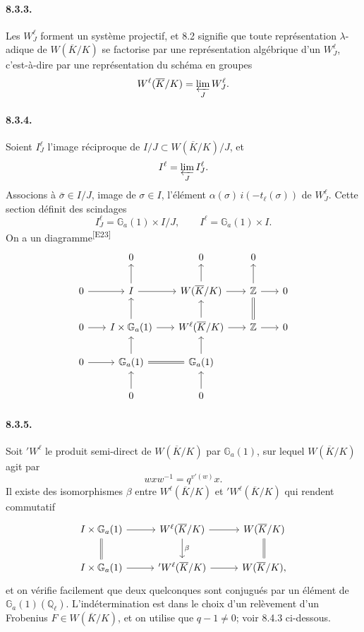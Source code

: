 \documentclass[10pt,letterpaper]{article}
\newcommand{\Z}{\mathbb Z}
\newcommand{\auditmark}[1]{\textsuperscript{\normalfont\scriptsize[E#1]}}
\begin{document}
\paragraph{8.3.3.} Les \(W_J^\ell\) forment un système projectif, et 8.2 signifie que toute représentation \(\lambda\)-adique de \(W(\overline K/K)\) se factorise par une représentation algébrique d'un \(W_J^\ell\), c'est-à-dire par une représentation du schéma en groupes
\[
W^\ell(\overline K/K)=\varprojlim_J W_J^\ell.
\]

\paragraph{8.3.4.} Soient \(I_J^\ell\) l'image réciproque de \(I/J\subset W(\overline K/K)/J\), et
\[
I^\ell=\varprojlim_J I_J^\ell.
\]
Associons à \(\bar\sigma\in I/J\), image de \(\sigma\in I\), l'élément \(\alpha(\sigma)\,i(-t_\ell(\sigma))\) de \(W_J^\ell\). Cette section définit des scindages
\[
I_J^\ell=\mathbb G_a(1)\times I/J,
\qquad
I^\ell=\mathbb G_a(1)\times I.
\]
On a un diagramme\auditmark{23}
\[
\begin{tikzcd}[column sep=1.8em,row sep=1.8em]
& 0 & 0 & 0 & \\
0 \arrow[r] & I \arrow[r] \arrow[u] & W(\overline K/K) \arrow[r] \arrow[u] & \Z \arrow[r] \arrow[u] & 0\\
0 \arrow[r] & I\times\mathbb G_a(1) \arrow[r] \arrow[u] & W^\ell(\overline K/K) \arrow[r] \arrow[u] & \Z \arrow[r] \arrow[u,equal] & 0\\
0 \arrow[r] & \mathbb G_a(1) \arrow[r,equal] \arrow[u] & \mathbb G_a(1) \arrow[u] & &\\
& 0 \arrow[u] & 0 \arrow[u] & &
\end{tikzcd}
\]

\paragraph{8.3.5.} Soit \({}'W^\ell\) le produit semi-direct de \(W(\overline K/K)\) par \(\mathbb G_a(1)\), sur lequel \(W(\overline K/K)\) agit par
\[
w x w^{-1}=q^{v'(w)}x.
\]
Il existe des isomorphismes \(\beta\) entre \(W^\ell(\overline K/K)\) et \({}'W^\ell(\overline K/K)\) qui rendent commutatif
\[
\begin{tikzcd}[column sep=2.8em,row sep=2.0em]
I\times\mathbb G_a(1)\arrow[r]\arrow[d,equal]&
W^\ell(\overline K/K)\arrow[r]\arrow[d,"\beta"]&
W(\overline K/K)\arrow[d,equal]\\
I\times\mathbb G_a(1)\arrow[r]&
{}'W^\ell(\overline K/K)\arrow[r]&
W(\overline K/K),
\end{tikzcd}
\]
et on vérifie facilement que deux quelconques sont conjugués par un élément de \(\mathbb G_a(1)(\mathbb Q_\ell)\). L'indétermination est dans le choix d'un relèvement d'un Frobenius \(F\in W(\overline K/K)\), et on utilise que \(q-1\ne0\); voir 8.4.3 ci-dessous.
\end{document}
